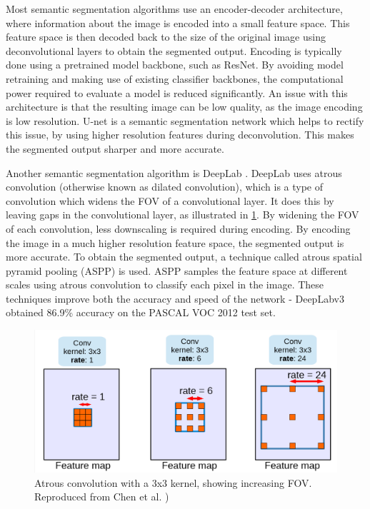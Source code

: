 \documentclass[12pt]{article}
\begin{document}
Most semantic segmentation algorithms use an encoder-decoder architecture, where information about the image is encoded into a small feature space.
This feature space is then decoded back to the size of the original image using deconvolutional layers to obtain the segmented output.
Encoding is typically done using a pretrained model backbone, such as ResNet. By avoiding model retraining and making use of
existing classifier backbones, the computational power required to evaluate a model is reduced significantly.
An issue with this architecture is that the resulting image can be low quality, as the image encoding is low resolution.
U-net \cite{ronnebergerUNetConvolutionalNetworks2015} is a semantic segmentation network which helps to rectify this issue,
by using higher resolution features during deconvolution.
This makes the segmented output sharper and more accurate.

Another semantic segmentation algorithm is DeepLab \cite{chenSemanticImageSegmentation2014}\cite{chenDeepLabSemanticImage2016}\cite{chenRethinkingAtrousConvolution2017}.
DeepLab uses atrous convolution (otherwise known as dilated convolution), which is a type of convolution which widens the FOV of a convolutional layer.
It does this by leaving gaps in the convolutional layer, as illustrated in \cref{fig:atrous_convolution}.
By widening the FOV of each convolution, less downscaling is required during encoding. By encoding the image in a much higher resolution feature space,
the segmented output is more accurate.
To obtain the segmented output, a technique called atrous spatial pyramid pooling (ASPP) is used. ASPP samples the feature space at different
scales using atrous convolution to classify each pixel in the image.
These techniques improve both the accuracy and speed of the network - DeepLabv3 obtained 86.9\% accuracy on the PASCAL VOC 2012 test set.

\begin{figure}[bp]
    \centering
    \includegraphics[width=0.6\linewidth]{images/atrous_convolution.png}
    \caption{Atrous convolution with a 3x3 kernel, showing increasing FOV. Reproduced from Chen et al. \cite{chenRethinkingAtrousConvolution2017})}
    \label{fig:atrous_convolution}
\end{figure}
\end{document}
